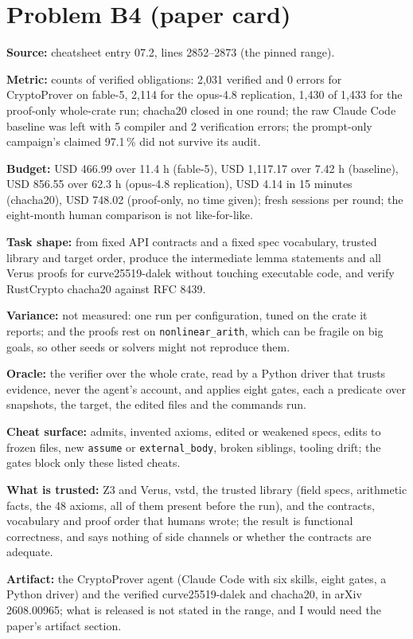 \documentclass[11pt]{article}
\begin{document}
\section*{Problem B4 (paper card)}\label{ans:B4}
\begin{answer}
\textbf{Source:} cheatsheet entry 07.2, lines 2852--2873 (the pinned range).

\textbf{Metric:} counts of verified obligations: 2,031 verified and 0 errors for
CryptoProver on fable-5, 2,114 for the opus-4.8 replication, 1,430 of 1,433 for
the proof-only whole-crate run; chacha20 closed in one round; the raw Claude Code
baseline was left with 5 compiler and 2 verification errors; the prompt-only
campaign's claimed 97.1\,\% did not survive its audit.

\textbf{Budget:} USD 466.99 over 11.4 h (fable-5), USD 1,117.17 over 7.42 h
(baseline), USD 856.55 over 62.3 h (opus-4.8 replication), USD 4.14 in 15
minutes (chacha20), USD 748.02 (proof-only, no time given); fresh sessions per
round; the eight-month human comparison is not like-for-like.

\textbf{Task shape:} from fixed API contracts and a fixed spec vocabulary,
trusted library and target order, produce the intermediate lemma statements and
all Verus proofs for curve25519-dalek without touching executable code, and
verify RustCrypto chacha20 against RFC 8439.

\textbf{Variance:} not measured: one run per configuration, tuned on the crate
it reports; and the proofs rest on \texttt{nonlinear\_arith}, which can be
fragile on big goals, so other seeds or solvers might not reproduce them.

\textbf{Oracle:} the verifier over the whole crate, read by a Python driver that
trusts evidence, never the agent's account, and applies eight gates, each a
predicate over snapshots, the target, the edited files and the commands run.

\textbf{Cheat surface:} admits, invented axioms, edited or weakened specs,
edits to frozen files, new \texttt{assume} or \texttt{external\_body}, broken
siblings, tooling drift; the gates block only these listed cheats.

\textbf{What is trusted:} Z3 and Verus, vstd, the trusted library (field specs,
arithmetic facts, the 48 axioms, all of them present before the run), and the
contracts, vocabulary and proof order that humans wrote; the result is
functional correctness, and says nothing of side channels or whether the
contracts are adequate.

\textbf{Artifact:} the CryptoProver agent (Claude Code with six skills, eight
gates, a Python driver) and the verified curve25519-dalek and chacha20, in arXiv
2608.00965; what is released is not stated in the range, and I would need the
paper's artifact section.
\end{answer}
\end{document}

